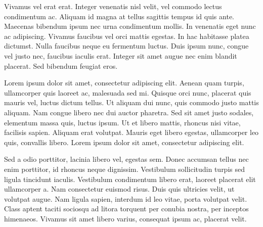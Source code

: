 \documentclass[rascunho]{fei}
\begin{document}
Vivamus vel erat erat. Integer venenatis nisl velit, vel commodo lectus condimentum ac. Aliquam id magna at tellus sagittis tempus id quis ante. Maecenas bibendum ipsum nec urna condimentum mollis. In venenatis eget nunc ac adipiscing. Vivamus faucibus vel orci mattis egestas. In hac habitasse platea dictumst. Nulla faucibus neque eu fermentum luctus. Duis ipsum nunc, congue vel justo nec, faucibus iaculis erat. Integer sit amet augue nec enim blandit placerat. Sed bibendum feugiat eros.

Lorem ipsum dolor sit amet, consectetur adipiscing elit. Aenean quam turpis, ullamcorper quis laoreet ac, malesuada sed mi. Quisque orci nunc, placerat quis mauris vel, luctus dictum tellus. Ut aliquam dui nunc, quis commodo justo mattis aliquam. Nam congue libero nec dui auctor pharetra. Sed sit amet justo sodales, elementum massa quis, luctus ipsum. Ut et libero mattis, rhoncus nisi vitae, facilisis sapien. Aliquam erat volutpat. Mauris eget libero egestas, ullamcorper leo quis, convallis libero. Lorem ipsum dolor sit amet, consectetur adipiscing elit.

Sed a odio porttitor, lacinia libero vel, egestas sem. Donec accumsan tellus nec enim porttitor, id rhoncus neque dignissim. Vestibulum sollicitudin turpis sed ligula tincidunt iaculis. Vestibulum condimentum libero erat, laoreet placerat elit ullamcorper a. Nam consectetur euismod risus. Duis quis ultricies velit, ut volutpat augue. Nam ligula sapien, interdum id leo vitae, porta volutpat velit. Class aptent taciti sociosqu ad litora torquent per conubia nostra, per inceptos himenaeos. Vivamus sit amet libero varius, consequat ipsum ac, placerat velit.
\end{document}

